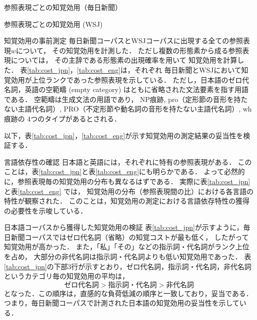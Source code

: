 \documentclass[japanese]{jnlp_1.3e}
\renewcommand{\paragraph}{}
\begin{document}
\begin{table}[b]
\caption{参照表現ごとの知覚効用（毎日新聞）}
\label{tab:cost_jpn}

\end{table}
\begin{table}[t]
\caption{参照表現ごとの知覚効用 (WSJ)}
\label{tab:cost_eng}

\end{table}


\paragraph{知覚効用の事前測定}
毎日新聞コーパスとWSJコーパスに出現する全ての参照表現$w$について，
その知覚効用を計測した．
ただし複数の形態素から成る参照表現については，
その主辞である形態素の出現確率を用いて
知覚効用を計算した．
表\ref{tab:cost_jpn}，\ref{tab:cost_eng}は，それぞれ
毎日新聞とWSJにおいて知覚効用が上位ランクであった参照表現を示している．
ただし，日本語のゼロ代名詞，英語の空範疇 (empty category) はともに省略された文法要素を指す用語である．
空範疇は生成文法の用語であり，
NP痕跡, pro（定形節の音形を持たない主語代名詞）, PRO（不定形節や動名詞の音形を持たない主語代名詞）, wh痕跡の
4つのタイプがあるとされる．

以下，表\ref{tab:cost_jpn}，\ref{tab:cost_eng}が示す知覚効用の測定結果の妥当性を検証する．



\paragraph{言語依存性の確認}
日本語と英語には，それぞれに特有の参照表現がある．
このことは，表\ref{tab:cost_jpn}と表\ref{tab:cost_eng}にも明らかである．
よって必然的に，参照表現毎の知覚効用の分布も異なるはずである．
実際に表\ref{tab:cost_jpn}と表\ref{tab:cost_eng} では，
知覚効用の分布（参照表現間の比）における各言語の特性が観察された．
このことは，知覚効用の測定における言語依存特性の獲得の必要性を示唆している．



\paragraph{日本語コーパスから獲得した知覚効用の検証}
表\ref{tab:cost_jpn}が示すように，毎日新聞コーパスではゼロ代名詞（省略）の知覚コストが最も低く，
したがって知覚効用が高かった．
また，「私」「その」などの指示詞・代名詞がランク上位を占め，
大部分の非代名詞は指示詞・代名詞よりも低い知覚効用であった．
表\ref{tab:cost_jpn}の下部3行が示すとおり，ゼロ代名詞，指示詞・代名詞，非代名詞というカテゴリ毎の知覚効用の平均は，
\[
 \text{ゼロ代名詞} > \text{指示詞・代名詞} > \text{非代名詞}
\]
となった．この順序は，直感的な負荷低減の順序と一致しており，妥当である．
つまり，毎日新聞コーパスで計測された日本語の知覚効用の妥当性を示している．
\end{document}
